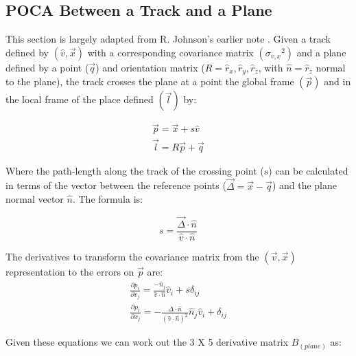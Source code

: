 \documentclass[fleqn,twoside,draft]{article}
\begin{document}
\subsection{POCA Between a Track and a Plane}

This section is largely adapted from R. Johnson's earlier note \cite{planeError}.  Given a track defined by $(\hat{v},\vec{x})$ with a corresponding covariance matrix $({\sigma_{v,x}}^2)$ and a plane defined by a point ($\vec{q}$) and orientation matrix ($R = \hat{r}_x,\hat{r}_y,\hat{r}_z$, with $\hat{n} = \hat{r}_z$ normal to the plane), the track crosses the plane at a point the global frame $(\vec{p})$ and in the local frame of the place defined $(\vec{l})$  by:

\begin{subequations}
\begin{gather}
  \vec{p} = \vec{x} + s \hat{v} \\
  \vec{l} = R \vec{p} + \vec{q}
\end{gather}
\end{subequations}

Where the path-length along the track of the crossing point ($s$) can be calculated in terms of the vector between the reference points ($\vec{\Delta} = \vec{x} - \vec{q}$) and the plane normal vector $\hat{n}$.  The formula is:

\begin{equation}
  s = \frac{\vec{\Delta} \cdot \hat{n}}{ \hat{v} \cdot \hat{n}}
\end{equation}

The derivatives to transform the covariance matrix from the $(\vec{v},\vec{x})$ representation to the errors on $\vec{p}$ are:
\begin{subequations}
\begin{gather}
  \frac{\partial p_{i}}{\partial v_{j}} = \frac{- \hat{n}_j}{\hat{v}\cdot\hat{n}} \hat{v}_i
                                        + s \delta_{ij} \\
  \frac{\partial p_{i}}{\partial x_{j}} = -\frac{\Delta\cdot\hat{n}}{(\hat{v}\cdot\hat{n})^2}\hat{n}_{j}\hat{v}_i
                                        + \delta_{ij} 
\end{gather}
\end{subequations}

Given these equations we can work out the 3 X 5 derivative matrix $B_{(plane)}$ as:
\end{document}
